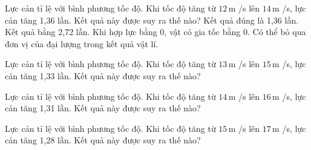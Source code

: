 \begin{ex}
Lực cản tỉ lệ với bình phương tốc độ. Khi tốc độ tăng từ $12\,\text{m}$ /s lên $14\,\text{m}$ /s, lực cản tăng 1,36 lần. Kết quả này được suy ra thế nào?
\choiceTF
{\True Kết quả đúng là 1,36 lần.}
{Kết quả bằng 2,72 lần.}
{\True Khi hợp lực bằng 0, vật có gia tốc bằng 0.}
{Có thể bỏ qua đơn vị của đại lượng trong kết quả vật lí.}
\end{ex}

\begin{ex}
Lực cản tỉ lệ với bình phương tốc độ. Khi tốc độ tăng từ $13\,\text{m}$ /s lên $15\,\text{m}$ /s, lực cản tăng 1,33 lần. Kết quả này được suy ra thế nào?
\end{ex}

\begin{ex}
Lực cản tỉ lệ với bình phương tốc độ. Khi tốc độ tăng từ $14\,\text{m}$ /s lên $16\,\text{m}$ /s, lực cản tăng 1,31 lần. Kết quả này được suy ra thế nào?
\end{ex}

\begin{ex}
Lực cản tỉ lệ với bình phương tốc độ. Khi tốc độ tăng từ $15\,\text{m}$ /s lên $17\,\text{m}$ /s, lực cản tăng 1,28 lần. Kết quả này được suy ra thế nào?
\end{ex}

